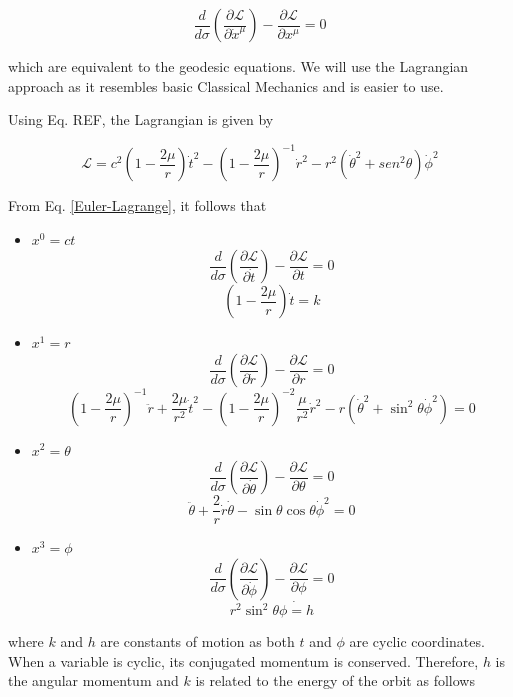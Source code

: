 \documentclass[letterpaper,11pt,onecolumn]{article}
\begin{document}
\begin{equation}\label{Euler-Lagrange}
\frac{d}{d\sigma} \left( \frac{\partial \mathcal{L}}{\partial \dot{x}^\mu}\right) - \frac{\partial \mathcal{L}}{\partial x^\mu} = 0
\end{equation}

which are equivalent to the geodesic equations. We will use the Lagrangian approach as it resembles basic Classical Mechanics and is easier to use. 

Using Eq. {\color{red} REF}, the Lagrangian is given by 

\begin{equation} \label{Lagrangian}
    \mathcal{L} = c^{2}\left( 1-\frac{2\mu}{r} \right)\dot{t}^{2}-\left( 1-\frac{2\mu}{r}\right)^{-1}\dot{r}^{2}-r^{2}\left(\dot{\theta}^{2}+sen^{2}\theta\right)\dot{\phi}^{2}
\end{equation}

From Eq. \ref{Euler-Lagrange}, it follows that

\begin{itemize}
    \item $x^0 = ct$
    $$\frac{d}{d\sigma} \left( \frac{\partial \mathcal{L}}{\partial \dot{t}}\right) - \frac{\partial \mathcal{L}}{\partial t} = 0$$  $$\left( 1 - \frac{2 \mu}{r} \right) \dot{t} = k$$
    
    \item $x^1 = r$
    $$\frac{d}{d\sigma} \left( \frac{\partial \mathcal{L}}{\partial \dot{r}}\right) - \frac{\partial \mathcal{L}}{\partial r} = 0 $$
    $$\left( 1 - \frac{2 \mu}{r} \right)^{-1} \ddot{r} + \frac{2\mu}{r^2} \dot{t}^2 - \left( 1 - \frac{2 \mu}{r} \right)^{-2} \frac{\mu}{r^2} \dot{r}^2 - r \left( \dot{\theta}^2 + \sin^2 \theta \dot{\phi}^2  \right) = 0$$
    
    \item $x^2 = \theta$
    $$\frac{d}{d\sigma} \left( \frac{\partial \mathcal{L}}{\partial \dot{\theta}}\right) - \frac{\partial \mathcal{L}}{\partial \theta} = 0 $$
    $$\ddot{\theta} + \frac{2}{r} \dot{r} \dot{\theta} - \sin \theta \cos \theta \dot{\phi}^2 = 0$$
    
    \item $x^3 = \phi$
     $$ \frac{d}{d\sigma} \left( \frac{\partial \mathcal{L}}{\partial \dot{\phi}}\right) - \frac{\partial \mathcal{L}}{\partial \phi} = 0 $$
     $$r^2 \sin^2 \theta \dot{\phi = h }$$
    
\end{itemize}

where $k$ and $h$ are constants of motion as both $t$ and $\phi$ are cyclic coordinates. When a variable is cyclic, its conjugated momentum is conserved. Therefore, $h$ is the angular momentum and  $k$ is related to the energy of the orbit as follows
\end{document}
